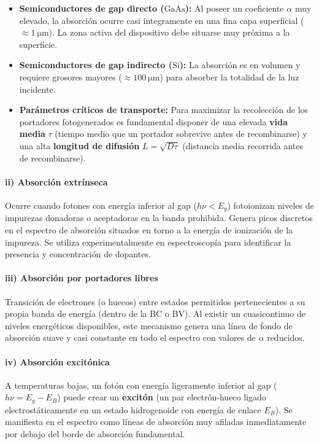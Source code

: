 \begin{concepto}
\begin{itemize}
    \item \textbf{Semiconductores de gap directo ($\text{GaAs}$):} Al poseer un coeficiente $\alpha$ muy elevado, la absorción ocurre casi íntegramente en una fina capa superficial ($\approx \SI{1}{\micro\meter}$). La zona activa del dispositivo debe situarse muy próxima a la superficie.
    \item \textbf{Semiconductores de gap indirecto ($\text{Si}$):} La absorción es en volumen y requiere grosores mayores ($\approx \SI{100}{\micro\meter}$) para absorber la totalidad de la luz incidente.
    \item \textbf{Parámetros críticos de transporte:} Para maximizar la recolección de los portadores fotogenerados es fundamental disponer de una elevada \textbf{vida media} $\tau$ (tiempo medio que un portador sobrevive antes de recombinarse) y una alta \textbf{longitud de difusión} $L = \sqrt{D\tau}$ (distancia media recorrida antes de recombinarse).
\end{itemize}
\end{concepto}

\paragraph{ii) Absorción extrínseca}
Ocurre cuando fotones con energía inferior al gap ($h\nu < E_g$) fotoionizan niveles de impurezas donadoras o aceptadoras en la banda prohibida. Genera picos discretos en el espectro de absorción situados en torno a la energía de ionización de la impureza. Se utiliza experimentalmente en espectroscopía para identificar la presencia y concentración de dopantes.

\paragraph{iii) Absorción por portadores libres}
Transición de electrones (o huecos) entre estados permitidos pertenecientes a su propia banda de energía (dentro de la BC o BV). Al existir un cuasicontinuo de niveles energéticos disponibles, este mecanismo genera una línea de fondo de absorción suave y casi constante en todo el espectro con valores de $\alpha$ reducidos.

\paragraph{iv) Absorción excitónica}
A temperaturas bajas, un fotón con energía ligeramente inferior al gap ($h\nu = E_g - E_B$) puede crear un \textbf{excitón} (un par electrón-hueco ligado electrostáticamente en un estado hidrogenoide con energía de enlace $E_B$). Se manifiesta en el espectro como líneas de absorción muy afiladas inmediatamente por debajo del borde de absorción fundamental.

